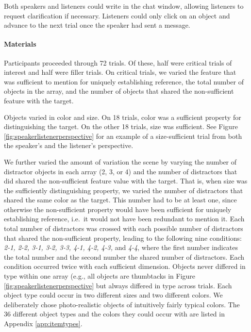 \documentclass[11pt]{article}
\newcommand{\figref}[1]{Figure \ref{#1}}
\newcommand{\appref}[1]{Appendix \ref{#1}}
\begin{document}
Both speakers and listeners could write in the chat window, allowing listeners to request clarification if necessary. Listeners could only click on an object and advance to the next trial once the speaker had sent a message. 


\paragraph{Materials}

Participants proceeded through 72 trials. Of these, half were critical trials of interest and half were filler trials. On critical trials, we varied the feature that was sufficient to mention for uniquely establishing reference, the total number of objects in the array, and  the number of objects that shared the non-sufficient feature with the target. 

Objects varied in color and size. On 18 trials, color was a sufficient property for distinguishing the target. On the other 18 trials, size was sufficient. See \figref{fig:speakerlistenerperspective} for an example of a size-sufficient trial from both the speaker's and the listener's perspective. 

We further varied the amount of variation the scene by varying the number of distractor objects in each array (2, 3, or  4) and the number of distractors that did shared the non-sufficient feature value with the target. That is, when size was the sufficiently distinguishing property, we varied the number of distractors that shared the same color as the target. This number had to be at least one, since otherwise the non-sufficient property would have been sufficient for uniquely establishing reference, i.e.~it would not have been redundant to mention it. Each total number of distractors was crossed with each possible number of distractors that shared the non-sufficient property, leading to the following nine conditions: \emph{2-1, 2-2, 3-1, 3-2, 3-3, 4-1, 4-2, 4-3,} and \emph{4-4}, where the first number indicates the total number and the second number the shared number of distractors. Each condition occurred twice with each sufficient dimension. Objects never differed in type within one array (e.g., all objects are thumbtacks in \figref{fig:speakerlistenerperspective} but always differed in type across trials. Each object type could occur in two different sizes and two different colors. We deliberately chose photo-realistic objects of intuitively fairly typical colors. The 36 different object types and the colors they could occur with are listed in \appref{app:itemtypes}. 
\end{document}
